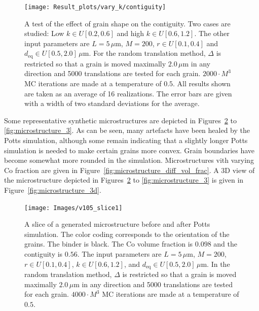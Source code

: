 \documentclass[10pt,a4paper]{article}
\begin{document}
\begin{figure}
	\begin{center}
		\texttt{[image: Result\_plots/vary\_k/contiguity]}
		\caption{A test of the effect of grain shape on the contiguity. Two cases are studied: Low $k \in U[0.2, 0.6]$ and high $k \in U[0.6, 1.2]$. The other input parameters are $L=5 \, \mu\text{m}$, $M=200$, $r \in U[0.1, 0.4]$ and $d_\text{eq} \in U[0.5, 2.0] \, \mu\text{m}$. For the random translation method, $\Delta$ is restricted so that a grain is moved maximally $2.0 \, \mu \text{m}$ in any direction and 5000 translations are tested for each grain. $2000 \cdot M^3$ MC iterations are made at a temperature of $0.5$. All results shown are taken as an average of 16 realizations. The error bars are given with a width of two standard deviations for the average.}
		\label{fig:vary_k}
	\end{center}
\end{figure}

Some representative synthetic microstructures are depicted in Figures~\ref{fig:microstructure_1} to \ref{fig:microstructure_3}. As can be seen, many artefacts have been healed by the Potts simulation, although some remain indicating that a slightly longer Potts simulation is needed to make certain grains more convex. Grain boundaries have become somewhat more rounded in the simulation. Microstructures vith varying Co fraction are given in Figure~\ref{fig:microstructure_diff_vol_frac}. A 3D view of the microstructure depicted in Figures~\ref{fig:microstructure_1} to \ref{fig:microstructure_3} is given in Figure~\ref{fig:microstructure_3d}.

\begin{figure}
	\begin{center}
		\texttt{[image: Images/v105\_slice1]}
	\end{center}
	\caption{A slice of a generated microstructure before and after Potts simulation. The color coding corresponds to the orientation of the grains. The binder is black. The Co volume fraction is $0.098$ and the contiguity is $0.56$. The input parameters are $L=5 \, \mu\text{m}$, $M=200$, $r \in U[0.1, 0.4]$, $k \in U[0.6, 1.2]$, and $d_\text{eq} \in U[0.5, 2.0] \, \mu\text{m}$. In the random translation method, $\Delta$ is restricted so that a grain is moved maximally $2.0 \, \mu \text{m}$ in any direction and 5000 translations are tested for each grain. $4000 \cdot M^3$ MC iterations are made at a temperature of $0.5$.}
	\label{fig:microstructure_1}
\end{figure}
\end{document}
